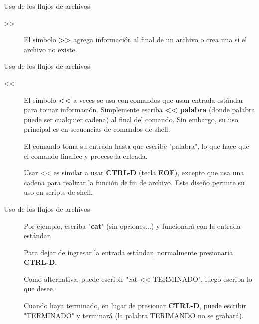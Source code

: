 \begin{frame}[c]{Uso de los flujos de archivos}
  \begin{description}
    \item[>{}>] 
      El símbolo \textbf{>{}>} agrega información al final de un archivo o
      crea una si el archivo no existe.
  \end{description}
\end{frame}

\begin{frame}[c]{Uso de los flujos de archivos}
  \begin{description}
    \item[<{}<]
      El símbolo \textbf{<{}<} a veces se usa con comandos que usan entrada
      estándar para tomar información. Simplemente escriba \textbf{<{}<
      palabra} (donde palabra puede ser cualquier cadena) al final del
      comando. Sin embargo, su uso principal es en secuencias de comandos de
      shell.

      \vspace{\baselineskip}
      El comando toma su entrada hasta que escribe "palabra",
      lo que hace que el comando finalice y procese la entrada.

      \vspace{\baselineskip}
      Usar << es similar a usar \textbf{CTRL-D} (tecla \textbf{EOF}),
      excepto que usa una cadena para realizar la función de fin de archivo.
      Este diseño permite su uso en scripts de shell.
  \end{description}
\end{frame}

\begin{frame}[c]{Uso de los flujos de archivos}
  \begin{description}
    \item[]
      \vspace{\baselineskip}
      Por ejemplo, escriba "\textbf{cat}" (sin opciones...) y funcionará con
      la entrada estándar.

      \vspace{\baselineskip}
      Para dejar de ingresar la entrada estándar, normalmente presionaría
      \textbf{CTRL-D}.

      \vspace{\baselineskip}
      Como alternativa, puede escribir "cat <{}< TERMINADO", luego escriba lo
      que desee.

      \vspace{\baselineskip}
      Cuando haya terminado, en lugar de presionar \textbf{CTRL-D}, puede
      escribir "TERMINADO" y terminará (la palabra TERIMANDO no se grabará).
  \end{description}
\end{frame}


